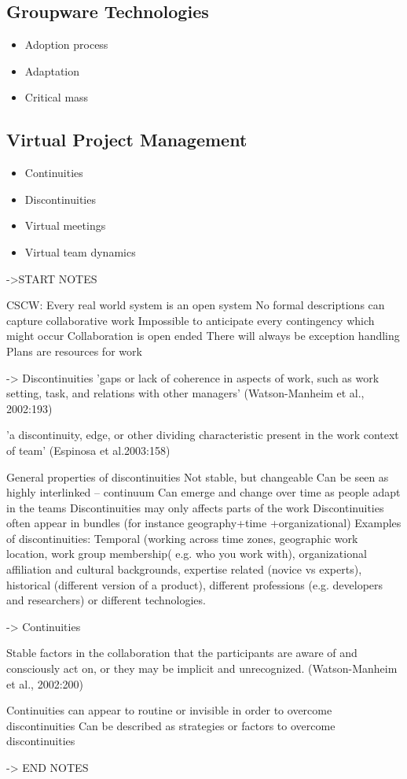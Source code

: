 \subsection{Groupware Technologies}
\begin{itemize}
  \item Adoption process
  \item Adaptation
  \item Critical mass
\end{itemize}

\subsection{Virtual Project Management}
\begin{itemize}
  \item Continuities
  \item Discontinuities
  \item Virtual meetings
	\item Virtual team dynamics
\end{itemize}

->START NOTES

CSCW: Every real world system is an open system
No formal descriptions can capture collaborative work
Impossible to anticipate every contingency which might occur
Collaboration is open ended
There will always be exception handling
Plans are resources for work

-> Discontinuities
'gaps or lack of coherence in aspects of work, such as work 
setting, task, and relations with other managers' (Watson-Manheim et al., 2002:193)

'a discontinuity, edge, or other dividing characteristic 
present in the work context of team' (Espinosa et al.2003:158)


General properties of discontinuities 
Not stable, but changeable 
Can be seen as highly interlinked – continuum
Can emerge and change over time as people adapt in the teams 
Discontinuities may only affects parts of the work 
Discontinuities often appear in bundles (for instance geography+time
+organizational)
Examples of discontinuities: Temporal (working across time zones, 
geographic work location, work group membership( e.g. who you work 
with), organizational affiliation and cultural backgrounds, expertise related 
(novice vs experts), historical (different version of a product), different 
professions (e.g. developers and researchers) or different technologies.

-> Continuities

Stable factors in the collaboration that the participants are 
aware of and consciously act on, or they may be implicit and 
unrecognized. (Watson-Manheim et al., 2002:200) 

Continuities can appear to routine or invisible in order to 
overcome discontinuities
Can be described as strategies or factors to overcome 
discontinuities

-> END NOTES
